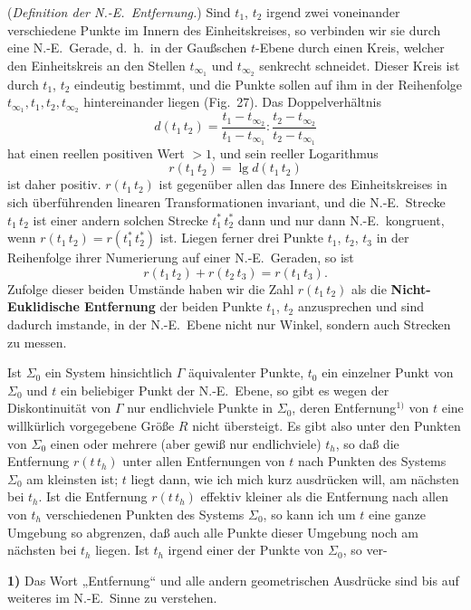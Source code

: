 \documentclass{article}
\begin{document}
(\emph{Definition der N.-E.\ Entfernung.}) Sind $t_1$, $t_2$ irgend zwei voneinander verschiedene Punkte im Innern des Einheitskreises, so verbinden wir sie durch eine N.-E.\ Gerade, d.~h.\ in der Gaußschen $t$-Ebene durch einen Kreis, welcher den Einheitskreis an den Stellen $t_{\infty_1}$ und $t_{\infty_2}$ senkrecht schneidet. Dieser Kreis ist durch $t_1$, $t_2$ eindeutig bestimmt, und die Punkte sollen auf ihm in der Reihenfolge $t_{\infty_1}, t_1, t_2, t_{\infty_2}$ hintereinander liegen (Fig.~27). Das Doppelverhältnis
\[ d(t_1\,t_2) = \frac{t_1 - t_{\infty_2}}{t_1 - t_{\infty_1}} : \frac{t_2 - t_{\infty_2}}{t_2 - t_{\infty_1}} \]
hat einen reellen positiven Wert $> 1$, und sein reeller Logarithmus
\[ r(t_1\,t_2) = \lg d(t_1\,t_2) \]
ist daher positiv. $r(t_1\,t_2)$ ist gegenüber allen das Innere des Einheitskreises in sich überführenden linearen Transformationen invariant, und die N.-E.\ Strecke $t_1\,t_2$ ist einer andern solchen Strecke $t_1^*\,t_2^*$ dann und nur dann N.-E.\ kongruent, wenn $r(t_1\,t_2) = r(t_1^*\,t_2^*)$ ist. Liegen ferner drei Punkte $t_1$, $t_2$, $t_3$ in der Reihenfolge ihrer Numerierung auf einer N.-E.\ Geraden, so ist
\[ r(t_1\,t_2) + r(t_2\,t_3) = r(t_1\,t_3). \]
Zufolge dieser beiden Umstände haben wir die Zahl $r(t_1\,t_2)$ als die \textbf{Nicht-Euklidische Entfernung} der beiden Punkte $t_1$, $t_2$ anzusprechen und sind dadurch imstande, in der N.-E.\ Ebene nicht nur Winkel, sondern auch Strecken zu messen.

Ist $\Sigma_0$ ein System hinsichtlich $\varGamma$ äquivalenter Punkte, $t_0$ ein einzelner Punkt von $\Sigma_0$ und $t$ ein beliebiger Punkt der N.-E.\ Ebene, so gibt es wegen der Diskontinuität von $\varGamma$ nur endlichviele Punkte in $\Sigma_0$, deren Entfernung${}^{1)}$ von $t$ eine willkürlich vorgegebene Größe $R$ nicht übersteigt. Es gibt also unter den Punkten von $\Sigma_0$ einen oder mehrere (aber gewiß nur endlichviele) $t_h$, so daß die Entfernung $r(t\,t_h)$ unter allen Entfernungen von $t$ nach Punkten des Systems $\Sigma_0$ am kleinsten ist; $t$ liegt dann, wie ich mich kurz ausdrücken will, am nächsten bei $t_h$. Ist die Entfernung $r(t\,t_h)$ effektiv kleiner als die Entfernung nach allen von $t_h$ verschiedenen Punkten des Systems $\Sigma_0$, so kann ich um $t$ eine ganze Umgebung so abgrenzen, daß auch alle Punkte dieser Umgebung noch am nächsten bei $t_h$ liegen. Ist $t_h$ irgend einer der Punkte von $\Sigma_0$, so ver-

\textbf{1)} Das Wort „Entfernung“ und alle andern geometrischen Ausdrücke sind bis auf weiteres im N.-E.\ Sinne zu verstehen.
\end{document}
